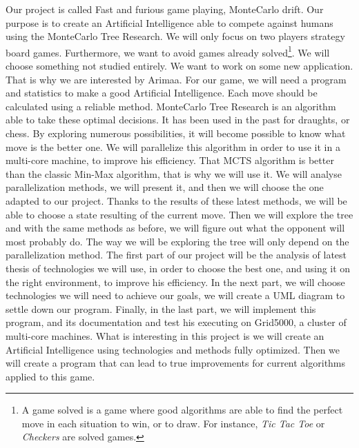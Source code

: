 
Our project is called Fast and furious game playing, MonteCarlo drift. Our purpose is to create an Artificial Intelligence able to compete against humans using the MonteCarlo Tree Research.
\newline
We will only focus on two players strategy board games. Furthermore, we want to avoid games already solved\footnote{A game solved is a game where good algorithms are able to find the perfect move in each situation to win, or to draw. For instance, \textit{Tic Tac Toe} or \textit{Checkers} are solved games.}. We will choose something not studied entirely. We want to work on some new application. That is why we are interested by Arimaa.
\newline
\newline
For our game, we will need a program and statistics to make a good Artificial Intelligence. Each move should be calculated using a reliable method.
MonteCarlo Tree Research is an algorithm able to take these optimal decisions. It has been used in the past for draughts, or chess. By exploring numerous possibilities, it will become possible to know what move is the better one.
We will parallelize this algorithm in order to use it in a multi-core machine, to improve his efficiency.
That MCTS algorithm is better than the classic Min-Max algorithm, that is why we will use it.
\newline
\newline
We will analyse parallelization methods, we will present it, and then we will choose the one adapted to our project.
Thanks to the results of these latest methods, we will be able to choose a state resulting of the current move. Then we will explore the tree and with the same methods as before, we will figure out what the opponent will most probably do. The way we will be exploring the tree will only depend on the parallelization method.
The first part of our project will be the analysis of latest thesis of technologies we will use, in order to choose the best one, and using it on the right environment, to improve his  efficiency.
In the next part, we will choose technologies we will need to achieve our goals, we will create a UML diagram to settle down our program.
\newline
\newline
Finally, in the last part, we will implement this program, and its documentation and test his executing on Grid5000, a cluster of multi-core machines.
What is interesting in this project is we will create an Artificial Intelligence using technologies and methods fully optimized. Then we will create a program that can lead to true improvements for current algorithms applied to this game.


